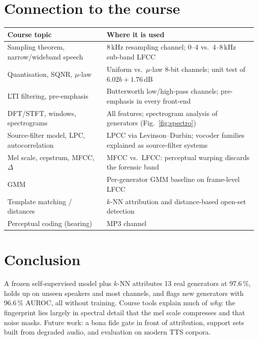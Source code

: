 \documentclass[11pt,a4paper]{article}
\begin{document}
\section{Connection to the course}
\begin{table}[H]
\centering\small
\begin{tabularx}{\linewidth}{@{}>{\raggedright\arraybackslash}p{4.2cm}X@{}}
\toprule
\textbf{Course topic} & \textbf{Where it is used} \\
\midrule
Sampling theorem, narrow/wideband speech & 8\,kHz resampling channel; 0--4 vs.\ 4--8\,kHz sub-band LFCC \\
Quantisation, SQNR, $\mu$-law & Uniform vs.\ $\mu$-law 8-bit channels; unit test of $6.02b+1.76$\,dB \\
LTI filtering, pre-emphasis & Butterworth low/high-pass channels; pre-emphasis in every front-end \\
DFT/STFT, windows, spectrograms & All features; spectrogram analysis of generators (Fig.~\ref{fig:spectro}) \\
Source-filter model, LPC, autocorrelation & LPCC via Levinson--Durbin; vocoder families explained as source-filter systems \\
Mel scale, cepstrum, MFCC, $\Delta$ & MFCC vs.\ LFCC: perceptual warping discards the forensic band \\
GMM & Per-generator GMM baseline on frame-level LFCC \\
Template matching / distances & $k$-NN attribution and distance-based open-set detection \\
Perceptual coding (hearing) & MP3 channel \\
\bottomrule
\end{tabularx}
\end{table}

\section{Conclusion}
A frozen self-supervised model plus $k$-NN attributes 13 real generators at 97.6\,\%, holds up
on unseen speakers and most channels, and flags new generators with 96.6\,\% AUROC, all
without training. Course tools explain much of \emph{why}: the fingerprint lies largely in
spectral detail that the mel scale compresses and that noise masks. Future work: a bona fide
gate in front of attribution, support sets built from degraded audio, and evaluation on
modern TTS corpora.



\end{document}
